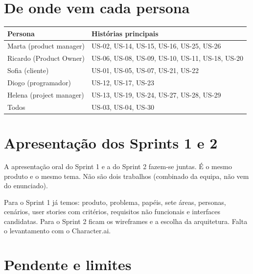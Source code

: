 \documentclass[12pt,a4paper]{article}
\begin{document}
\section{De onde vem cada persona}

\begin{center}
\begin{tabular}{lp{9cm}}
\toprule
Persona & Histórias principais \\
\midrule
Marta (product manager) & US-02, US-14, US-15, US-16, US-25, US-26 \\
Ricardo (Product Owner) & US-06, US-08, US-09, US-10, US-11, US-18, US-20 \\
Sofia (cliente) & US-01, US-05, US-07, US-21, US-22 \\
Diogo (programador) & US-12, US-17, US-23 \\
Helena (project manager) & US-13, US-19, US-24, US-27, US-28, US-29 \\
Todos & US-03, US-04, US-30 \\
\bottomrule
\end{tabular}
\end{center}

\section{Apresentação dos Sprints 1 e 2}

A apresentação oral do Sprint 1 e a do Sprint 2 fazem-se juntas. É o mesmo produto e o mesmo tema. Não são dois trabalhos (combinado da equipa, não vem do enunciado).

Para o Sprint 1 já temos: produto, problema, papéis, sete áreas, personas, cenários, user stories com critérios, requisitos não funcionais e interfaces candidatas. Para o Sprint 2 ficam os wireframes e a escolha da arquitetura. Falta o levantamento com o Character.ai.

\section{Pendente e limites}
\end{document}

